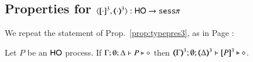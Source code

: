 %



\subsection{Properties for $\encod{\cdot}{\cdot}{3}: \HO \to \sessp$}
\label{app:enc_HO_to_sessp}

We repeat the statement of Prop.~\ref{prop:typepres3}, as in Page \pageref{prop:typepres3}:


\begin{proposition}
Let $P$ be an  $\mathsf{HO}$ process. 
If			$\Gamma; \emptyset; \Delta \vdash P \triangleright \diamond$ then 
			$\mapt{\Gamma}^{3}; \emptyset; \mapt{\Delta}^{3} \proves \map{P}^{3} \hastype \Proc$. 
\end{proposition}

